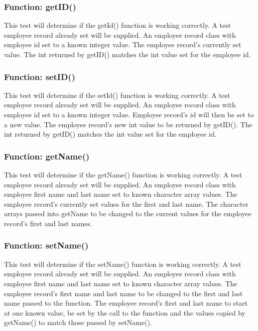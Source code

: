 \documentclass[12pt]{article}%
\newcounter{subsubsubsection}[subsubsection]
\begin{document}
\subsubsection{Function: getID()}
This test will determine if the getId() function is working correctly. A test
employee record already set will be supplied.
An employee record class with employee id set to a known integer value.
The employee record's currently set value.
The int returned by getID() matches the int value set for the employee id.

\subsubsection{Function: setID()}
This test will determine if the setId() function is working correctly. A test
employee record already set will be supplied.
An employee record class with employee id set to a known integer value.
Employee record's id  will then be set to a new value.
The employee record's new int value to be returned by getID().
The int returned by getID() matches the int value set for the employee id.

\subsubsection{Function: getName()}
This test will determine if the getName() function is working correctly. A test
employee record already set will be supplied.
An employee record class with employee first name and last name set to known character
array values.
The employee record's currently set values for the first and last name.
The character arrays passed into getName to be changed to the current values
for the employee record's first and last names.

\subsubsection{Function: setName()}
This test will determine if the setName() function is working correctly. A test
employee record already set will be supplied.
An employee record class with employee first name and last name set to known
character array values.
The employee record's first name and last name to be changed to the first and
last name passed to the function.
The employee record's first and last name to start at one known value, be set by the call
to the function and the values copied by getName() to match those passed by setName().
\end{document}
